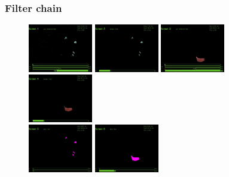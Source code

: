 \documentclass{beamer}
\begin{document}
	\begin{frame}
		\frametitle{Filter chain}
		\begin{figure}
		\hspace*{-2cm}
			\includegraphics[width=0.25\textwidth]{images/lab_green} \hspace{0.2cm}
		    \includegraphics[width=0.25\textwidth]{images/erosion_green} \hspace{0.2cm}	
			\includegraphics[width=0.25\textwidth]{images/lab_red} \hspace{0.2cm}
			\includegraphics[width=0.25\textwidth]{images/erosion_red} \vspace*{0.5cm}\\
		\hspace*{-2cm}
			\includegraphics[width=0.25\textwidth]{images/blob_green} \hspace{0.2cm}
			\includegraphics[width=0.25\textwidth]{images/blob_red} \hspace{0.2cm}

\end{figure}
\end{frame}
\end{document}
